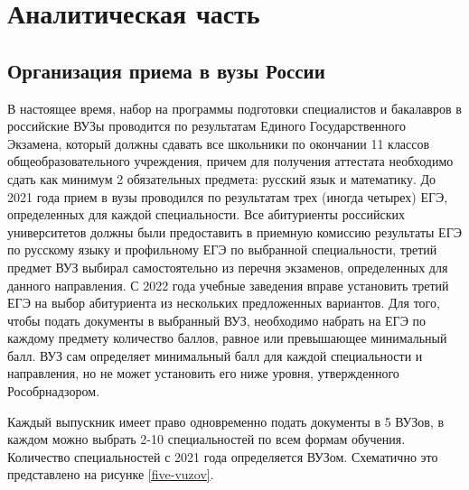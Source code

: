 \section{Аналитическая часть}

\subsection{Организация приема в вузы России}

В настоящее время, набор на программы подготовки специалистов и бакалавров в российские ВУЗы проводится по результатам Единого Государственного Экзамена\cite{ege}, который должны сдавать все школьники по окончании 11 классов общеобразовательного учреждения, причем для получения аттестата необходимо сдать как минимум 2 обязательных предмета: русский язык и математику. До 2021 года прием в вузы проводился по результатам трех (иногда четырех) ЕГЭ, определенных для каждой специальности. Все абитуриенты российских университетов должны были предоставить в приемную комиссию результаты ЕГЭ по русскому языку и профильному ЕГЭ по выбранной специальности, третий предмет ВУЗ выбирал самостоятельно из перечня экзаменов, определенных для данного направления. С 2022 года учебные заведения вправе установить третий ЕГЭ на выбор абитуриента из нескольких предложенных вариантов. Для того, чтобы подать документы в выбранный ВУЗ, необходимо набрать на ЕГЭ по каждому предмету количество баллов, равное или превышающее минимальный балл. ВУЗ сам определяет минимальный балл для каждой специальности и направления, но не может установить его ниже уровня, утвержденного Рособрнадзором\cite{prikaz}.

Каждый выпускник имеет право одновременно подать документы в 5 ВУЗов, в каждом можно выбрать 2-10 специальностей по всем формам обучения. Количество специальностей с 2021 года определяется ВУЗом. Схематично это представлено на рисунке \ref{five-vuzov}.

